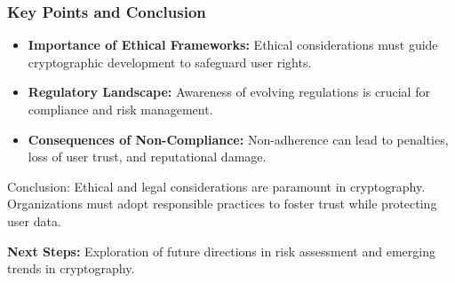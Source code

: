 \documentclass{beamer}
\begin{document}
\begin{frame}[fragile]
    \frametitle{Key Points and Conclusion}
    \begin{itemize}
        \item \textbf{Importance of Ethical Frameworks:} 
        Ethical considerations must guide cryptographic development to safeguard user rights.
        
        \item \textbf{Regulatory Landscape:} 
        Awareness of evolving regulations is crucial for compliance and risk management.
        
        \item \textbf{Consequences of Non-Compliance:} 
        Non-adherence can lead to penalties, loss of user trust, and reputational damage.
    \end{itemize}
    
    \begin{block}{Conclusion:}
        Ethical and legal considerations are paramount in cryptography. Organizations must adopt responsible practices to foster trust while protecting user data.
    \end{block}
    
    \textbf{Next Steps:} Exploration of future directions in risk assessment and emerging trends in cryptography.
\end{frame}
\end{document}

